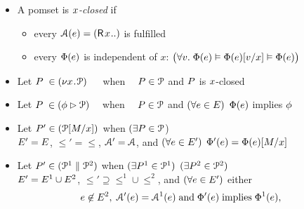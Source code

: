   \clearpage
  \begin{itemize}
  \item
    A pomset is \emph{$x$-closed} if
    \begin{itemize}
    \item every $\labelingAct(\aEv)=(\DR{\aLoc}{..})$ is fulfilled
    \item every $\Phi(e)$ is independent of $x$: $\bigl(\forall v.\;\Phi(e) \vDash \Phi(e)[v/x] \vDash
      \Phi(e)\bigr)$
    \end{itemize}
  \item
    Let $P\phantom{'}\in(\nu x\!\mathbin.\!\mathcal{P}) \mkern22mu$ when $\phantom{(\exists}P\in\mathcal{P}$
    and $P$ is $x$-closed
  \item 
    Let $P\phantom{'}\in(\phi \mathbin\rhd \mathcal{P})\mkern16mu$ when $\phantom{(\exists}P\in\mathcal{P}$ and 
    $(\forall e\in E)$ $\Phi(e)$ implies $\phi$
  \item 
    Let $P'\in(\mathcal{P}[M/x])\mkern2mu$ when
    $(\exists P\in\mathcal{P}$)\\\qquad $E' = E$, ${\le'} = {\le}$,
    $\mathcal{A}' = \mathcal{A}$, and
    $(\forall e\in E')$ $\Phi'(e) = \Phi(e)[M/x]$
  \item 
    Let $P' \in (\mathcal{P}^1 \parallel \mathcal{P}^2)$ when
    $(\exists P^1 \in \mathcal{P}^1)$ $(\exists P^2 \in \mathcal{P}^2)$
    \\%
    \qquad $E' = E^1 \cup E^2$,
    ${\le'}\supseteq{\le^1}\cup{\le^2}$, and $(\forall e\in E')$ either
    \begin{gather*}
      \begin{aligned}
        \aEv \not\in \Event^2,\; \labelingAct'(\aEv) &= \labelingAct^1(\aEv) \textand \labelingForm'(\aEv) \textimplies \labelingForm^1(\aEv),

\end{aligned}
\end{gather*}
\end{itemize}
